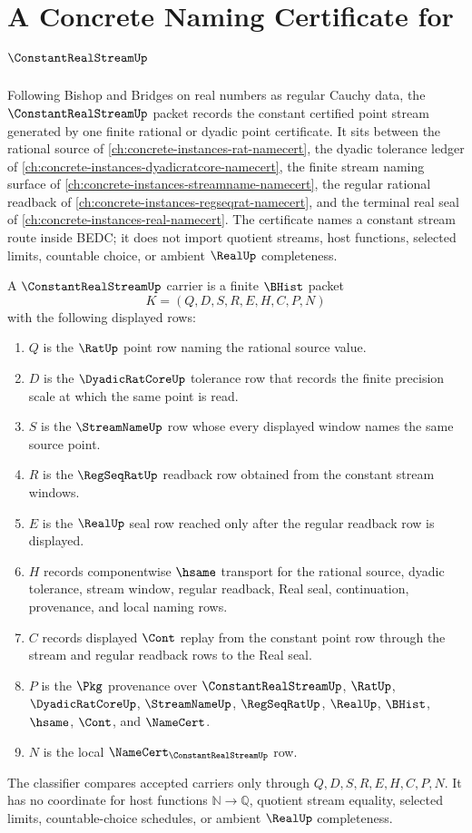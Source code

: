 \chapter{A Concrete Naming Certificate for $\ConstantRealStreamUp$}
\label{ch:concrete-instances-constant-real-stream-namecert}

Following Bishop and Bridges on real numbers as regular Cauchy data, the $\ConstantRealStreamUp$ packet records the constant certified point stream generated by one finite rational or dyadic point certificate. It sits between the rational source of \autoref{ch:concrete-instances-rat-namecert}, the dyadic tolerance ledger of \autoref{ch:concrete-instances-dyadicratcore-namecert}, the finite stream naming surface of \autoref{ch:concrete-instances-streamname-namecert}, the regular rational readback of \autoref{ch:concrete-instances-regseqrat-namecert}, and the terminal real seal of \autoref{ch:concrete-instances-real-namecert}. The certificate names a constant stream route inside BEDC; it does not import quotient streams, host functions, selected limits, countable choice, or ambient $\RealUp$ completeness.

\begin{definition}
\label{def:constant-real-stream-carrier}
A $\ConstantRealStreamUp$ carrier is a finite $\BHist$ packet
$$
K=(Q,D,S,R,E,H,C,P,N)
$$
with the following displayed rows:
\begin{enumerate}
\item $Q$ is the $\RatUp$ point row naming the rational source value.
\item $D$ is the $\DyadicRatCoreUp$ tolerance row that records the finite precision scale at which the same point is read.
\item $S$ is the $\StreamNameUp$ row whose every displayed window names the same source point.
\item $R$ is the $\RegSeqRatUp$ readback row obtained from the constant stream windows.
\item $E$ is the $\RealUp$ seal row reached only after the regular readback row is displayed.
\item $H$ records componentwise $\hsame$ transport for the rational source, dyadic tolerance, stream window, regular readback, Real seal, continuation, provenance, and local naming rows.
\item $C$ records displayed $\Cont$ replay from the constant point row through the stream and regular readback rows to the Real seal.
\item $P$ is the $\Pkg$ provenance over $\ConstantRealStreamUp$, $\RatUp$, $\DyadicRatCoreUp$, $\StreamNameUp$, $\RegSeqRatUp$, $\RealUp$, $\BHist$, $\hsame$, $\Cont$, and $\NameCert$.
\item $N$ is the local $\NameCert_{\ConstantRealStreamUp}$ row.
\end{enumerate}
The classifier compares accepted carriers only through $Q,D,S,R,E,H,C,P,N$. It has no coordinate for host functions $\mathbb{N}\to\mathbb{Q}$, quotient stream equality, selected limits, countable-choice schedules, or ambient $\RealUp$ completeness.
\end{definition}

